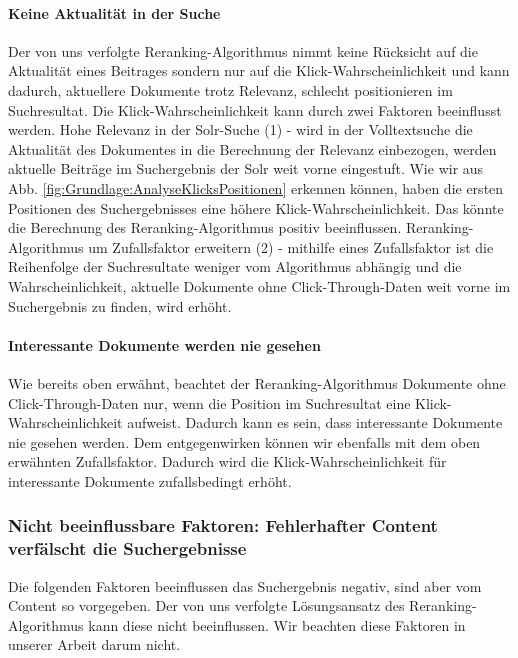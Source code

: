 \paragraph{Keine Aktualität in der Suche}
Der von uns verfolgte Reranking-Algorithmus nimmt keine Rücksicht auf die \glqq Aktualität\grqq{} eines Beitrages sondern nur auf die Klick-Wahrscheinlichkeit und kann dadurch, aktuellere Dokumente trotz Relevanz, schlecht positionieren im Suchresultat.  Die Klick-Wahrscheinlichkeit kann durch zwei Faktoren beeinflusst werden. Hohe Relevanz in der Solr-Suche (1) - wird in der Volltextsuche die Aktualität des Dokumentes in die Berechnung der Relevanz einbezogen, werden aktuelle Beiträge im Suchergebnis der Solr weit vorne eingestuft. Wie wir aus Abb. \ref{fig:Grundlage:AnalyseKlicksPositionen} erkennen können, haben die ersten Positionen des Suchergebnisses eine höhere Klick-Wahrscheinlichkeit. Das könnte die Berechnung des Reranking-Algorithmus positiv beeinflussen. Reranking-Algorithmus um Zufallsfaktor erweitern (2) - mithilfe eines Zufallsfaktor ist die Reihenfolge der Suchresultate weniger vom Algorithmus abhängig und die Wahrscheinlichkeit, aktuelle Dokumente ohne Click-Through-Daten weit vorne im Suchergebnis zu finden, wird erhöht.

\paragraph{Interessante Dokumente werden nie gesehen}
Wie bereits oben erwähnt, beachtet der Reranking-Algorithmus Dokumente ohne Click-Through-Daten nur, wenn die Position im Suchresultat eine Klick-Wahrscheinlichkeit aufweist. Dadurch kann es sein, dass interessante Dokumente nie gesehen werden. Dem entgegenwirken können wir ebenfalls mit dem oben erwähnten Zufallsfaktor. Dadurch wird die Klick-Wahrscheinlichkeit für interessante Dokumente zufallsbedingt erhöht.

\subsubsection{Nicht beeinflussbare Faktoren: Fehlerhafter Content verfälscht die Suchergebnisse}
\label{sec:Grundlagen:Grundbegriffe:SemantikUserInteraktionen:FehlerhafterContent}

Die folgenden Faktoren beeinflussen das Suchergebnis negativ, sind aber vom Content so vorgegeben. Der von uns verfolgte Lösungsansatz des Reranking-Algorithmus kann diese nicht beeinflussen. Wir beachten diese Faktoren in unserer Arbeit darum nicht.

